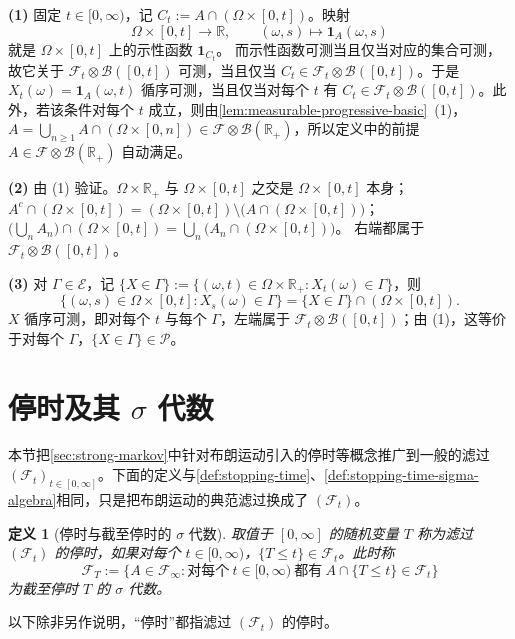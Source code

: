\documentclass[UTF8,11pt,a4paper,oneside,fontset=fandol]{ctexrep}
\makeatletter
\numberwithin{equation}{section}
\theoremstyle{zhthm}
\newtheorem{definition}[theorem]{定义}
\renewenvironment{proof}[1][\proofname]{\par
  \pushQED{\qed}%
  \normalfont\topsep6\p@\@plus6\p@\relax
  \trivlist
  \item[\hskip\labelsep\bfseries#1\hspace{0.5em}]\ignorespaces
}{%
  \popQED\endtrivlist\@endpefalse
}
\renewcommand{\proofname}{证明}
\newcommand{\R}{\mathbb{R}}
\newcommand{\B}{\mathcal{B}}
\newcommand{\F}{\mathcal{F}}
\newcommand{\ind}[1]{\mathbf{1}_{#1}}
\makeatother
\begin{document}
\begin{proof}
\textbf{(1)} 固定 $t\in[0,\infty)$，记 $C_t:=A\cap(\Omega\times[0,t])$。映射
\[
  \Omega\times[0,t]\to\R,\qquad (\omega,s)\mapsto\ind A(\omega,s)
\]
就是 $\Omega\times[0,t]$ 上的示性函数 $\ind{C_t}$。
而示性函数可测当且仅当对应的集合可测，故它关于 $\F_t\otimes\B([0,t])$ 可测，当且仅当 $C_t\in\F_t\otimes\B([0,t])$。于是 $X_t(\omega)=\ind A(\omega,t)$ 循序可测，当且仅当对每个 $t$ 有 $C_t\in\F_t\otimes\B([0,t])$。此外，若该条件对每个 $t$ 成立，则由\cref{lem:measurable-progressive-basic}~(1)，
$A=\bigcup_{n\ge1}A\cap(\Omega\times[0,n])\in\F\otimes\B(\R_+)$，所以定义中的前提 $A\in\F\otimes\B(\R_+)$ 自动满足。

\textbf{(2)} 由 (1) 验证。$\Omega\times\R_+$ 与 $\Omega\times[0,t]$ 之交是 $\Omega\times[0,t]$ 本身；
$A^c\cap(\Omega\times[0,t])=(\Omega\times[0,t])\setminus\bigl(A\cap(\Omega\times[0,t])\bigr)$；
$\bigl(\bigcup_nA_n\bigr)\cap(\Omega\times[0,t])=\bigcup_n\bigl(A_n\cap(\Omega\times[0,t])\bigr)$。
右端都属于 $\F_t\otimes\B([0,t])$。

\textbf{(3)} 对 $\Gamma\in\mathcal E$，记 $\{X\in\Gamma\}:=\{(\omega,t)\in\Omega\times\R_+:X_t(\omega)\in\Gamma\}$，则
\[
  \{(\omega,s)\in\Omega\times[0,t]:X_s(\omega)\in\Gamma\}=\{X\in\Gamma\}\cap(\Omega\times[0,t]).
\]
$X$ 循序可测，即对每个 $t$ 与每个 $\Gamma$，左端属于 $\F_t\otimes\B([0,t])$；由 (1)，这等价于对每个 $\Gamma$，$\{X\in\Gamma\}\in\mathscr P$。
\end{proof}

\section{停时及其 $\sigma$ 代数}
\label{sec:stopping-times-general}

本节把\cref{sec:strong-markov}中针对布朗运动引入的停时等概念推广到一般的滤过 $(\F_t)_{t\in[0,\infty]}$。下面的定义与\cref{def:stopping-time}、\cref{def:stopping-time-sigma-algebra}相同，只是把布朗运动的典范滤过换成了 $(\F_t)$。

\begin{definition}[停时与截至停时的 $\sigma$ 代数]
\label{def:stopping-time-general}
取值于 $[0,\infty]$ 的随机变量 $T$ 称为滤过 $(\F_t)$ 的停时，如果对每个 $t\in[0,\infty)$，$\{T\le t\}\in\F_t$。此时称
\[
  \F_T:=\bigl\{A\in\F_\infty:\text{对每个}\ t\in[0,\infty)\ \text{都有}\ A\cap\{T\le t\}\in\F_t\bigr\}
\]
为截至停时 $T$ 的 $\sigma$ 代数。
\end{definition}

以下除非另作说明，“停时”都指滤过 $(\F_t)$ 的停时。
\end{document}
